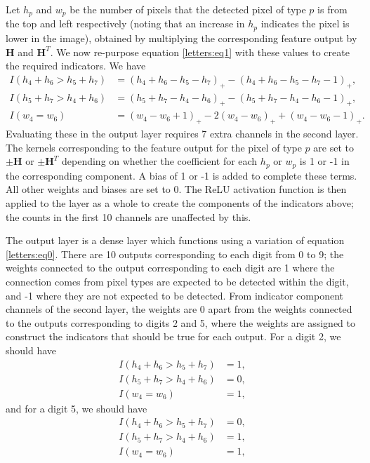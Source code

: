 \documentclass{somasmsc}
\begin{document}
Let $h_p$ and $w_p$ be the number of pixels that the detected pixel of type $p$ is from the top and left respectively (noting that an increase in $h_p$ indicates the pixel is lower in the image), obtained by multiplying the corresponding feature output by $\mathbf{H}$ and $\mathbf{H}^T$. We now re-purpose equation \ref{letters:eq1} with these values to create the required indicators. We have
\begin{align*}
    I(h_4 + h_6 > h_5 + h_7) &= \left(h_4 + h_6 - h_5 - h_7\right)_+ - \left(h_4 + h_6 - h_5 - h_7 - 1\right)_+, \\
    I(h_5 + h_7 > h_4 + h_6) &= \left(h_5 + h_7 - h_4 - h_6\right)_+ - \left(h_5 + h_7 - h_4 - h_6 - 1\right)_+, \\
    I(w_4 = w_6) &= \left(w_4 - w_6 + 1\right)_+ - 2\left(w_4 - w_6\right)_+ + \left(w_4 - w_6 - 1\right)_+.
\end{align*}
Evaluating these in the output layer requires 7 extra channels in the second layer. The kernels corresponding to the feature output for the pixel of type $p$ are set to $\pm \mathbf{H}$ or $\pm \mathbf{H}^T$ depending on whether the coefficient for each $h_p$ or $w_p$ is 1 or -1 in the corresponding component. A bias of 1 or -1 is added to complete these terms. All other weights and biases are set to 0. The ReLU activation function is then applied to the layer as a whole to create the components of the indicators above; the counts in the first 10 channels are unaffected by this.

The output layer is a dense layer which functions using a variation of equation \ref{letters:eq0}. There are 10 outputs corresponding to each digit from 0 to 9; the weights connected to the output corresponding to each digit are 1 where the connection comes from pixel types are expected to be detected within the digit, and -1 where they are not expected to be detected. From indicator component channels of the second layer, the weights are 0 apart from the weights connected to the outputs corresponding to digits 2 and 5, where the weights are assigned to construct the indicators that should be true for each output. For a digit 2, we should have
\begin{align*}
    I(h_4 + h_6 > h_5 + h_7) &= 1, \\
    I(h_5 + h_7 > h_4 + h_6) &= 0, \\
    I(w_4 = w_6) &= 1,
\end{align*}
and for a digit 5, we should have
\begin{align*}
    I(h_4 + h_6 > h_5 + h_7) &= 0, \\
    I(h_5 + h_7 > h_4 + h_6) &= 1, \\
    I(w_4 = w_6) &= 1,
\end{align*}
\end{document}
